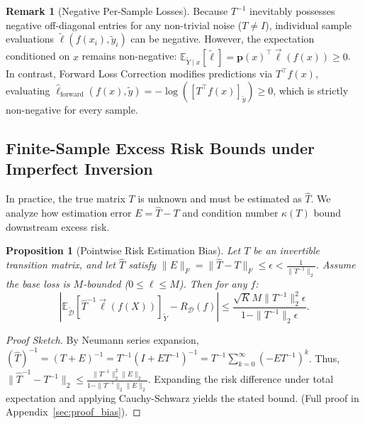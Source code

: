 \documentclass[journal]{IEEEtran}
\newtheorem{proposition}{Proposition}
\theoremstyle{definition}
\newtheorem{remark}{Remark}
\begin{document}
\begin{remark}[Negative Per-Sample Losses]
Because $T^{-1}$ inevitably possesses negative off-diagonal entries for any non-trivial noise ($T \ne I$), individual sample evaluations $\tilde{\ell}(f(x_i), \tilde{y}_i)$ can be negative. However, the expectation conditioned on $x$ remains non-negative: $\mathbb{E}_{\tilde{Y} \mid x}[\tilde{\ell}] = \mathbf{p}(x)^\top \vec{\ell}(f(x)) \ge 0$. In contrast, Forward Loss Correction modifies predictions via $T^\top f(x)$, evaluating $\hat{\ell}_{\text{forward}}(f(x), \tilde{y}) = -\log([T^\top f(x)]_{\tilde{y}}) \ge 0$, which is strictly non-negative for every sample.
\end{remark}

\subsection{Finite-Sample Excess Risk Bounds under Imperfect Inversion}
In practice, the true matrix $T$ is unknown and must be estimated as $\hat{T}$. We analyze how estimation error $E = \hat{T} - T$ and condition number $\kappa(T)$ bound downstream excess risk.

\begin{proposition}[Pointwise Risk Estimation Bias]
\label{prop:bias}
Let $T$ be an invertible transition matrix, and let $\hat{T}$ satisfy $\|E\|_F = \|\hat{T} - T\|_F \le \epsilon < \frac{1}{\|T^{-1}\|_2}$. Assume the base loss is $M$-bounded ($0 \le \ell \le M$). Then for any $f$:
\begin{equation}
\left| \mathbb{E}_{\tilde{\mathcal{D}}} [\hat{T}^{-1} \vec{\ell}(f(X))]_{\tilde{Y}} - R_{\mathcal{D}}(f) \right| \le \frac{\sqrt{K} M \|T^{-1}\|_2^2 \epsilon}{1 - \|T^{-1}\|_2 \epsilon}.
\end{equation}
\end{proposition}

\begin{proof}[Proof Sketch]
By Neumann series expansion, $(\hat{T})^{-1} = (T + E)^{-1} = T^{-1} (I + E T^{-1})^{-1} = T^{-1} \sum_{k=0}^\infty (-E T^{-1})^k$. Thus, $\|\hat{T}^{-1} - T^{-1}\|_2 \le \frac{\|T^{-1}\|_2^2 \|E\|_2}{1 - \|T^{-1}\|_2 \|E\|_2}$. Expanding the risk difference under total expectation and applying Cauchy-Schwarz yields the stated bound. (Full proof in Appendix~\ref{sec:proof_bias}).
\end{proof}
\end{document}
